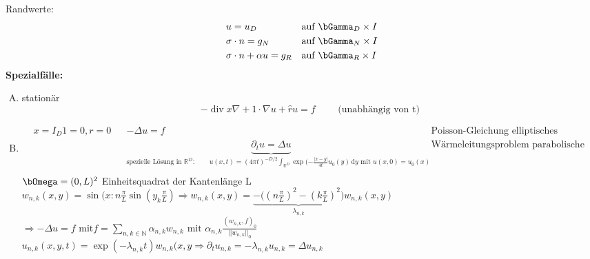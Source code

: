 \documentclass[12pt,twoside,reqno]{article}
\newcommand{\dy}{\,\mathrm{d}y}
\renewcommand\div{\operatorname{div}}
\renewcommand{\Omega}{\bOmega}
\renewcommand{\Gamma}{\bGamma}
\newcommand{\R}{\mathbb{R}}
\newcommand{\N}{\mathbb{N}}
\theoremstyle{TheoWieners}
\theoremstyle{break}
\theoremstyle{app}
\newtheorem{Spezielle Lösungen}[app]{Spezielle Lösungen}
\newtheorem{Spezielle Lösungen der Poisson-Gleichung}[app]{Spezielle Lösungen der Poisson-Gleichung}
\newtheorem{Kartesische Gitter in 2-d}[app]{Kartesische Gitter in 2-d}
\newtheorem{Diskretisierungen hoher Ordnung}[app]{Diskretisierungen hoher Ordnung}
\newtheorem{Zyklische Reduktion}[app]{Zyklische Reduktion}
\begin{document}
        
        Randwerte:
            \begin{align*}
        &u = u_D    &&\text{auf } \Gamma_D \times I \\
        &\sigma \cdot n = g_N    &&\text{auf } \Gamma_N \times I \\
        &\sigma \cdot n  + \alpha u = g_R    &&\text{auf } \Gamma_R \times I \\
    \end{align*}
    \textbf{Spezialfälle:}
    \begin{enumerate}[A)]
  \item stationär $$-\div x \nabla + 1 \cdot \nabla u + \hat{r}u= f \qquad \text{  (unabhängig von t)}$$
      \item            \begin{align*}
        &x = I_D 1=0, r=0    &&-\Delta u =f && \text{Poisson-Gleichung elliptisches Modellproblem} \\
        &    &&\underbrace{\partial_t u =\Delta u}_{\text{spezielle Lösung in } \R^D: \qquad u(x,t)= (4 \pi t)^{-D/2} \int_{\R^D} \exp(- \frac{|x-y|}{4t}u_0(y) \dy \text{ mit } u(x,0)= u_0(x)} &&\text{Wärmeleitungsproblem parabolische Modellproblem}\\
    \end{align*} 
     $\Omega =(0,L)^2$ Einheitsquadrat  der Kantenlänge L \\
     $w_{n,k}(x,y) = \sin(x:n \frac{\pi}{L} \sin(y_k \frac{\pi}{L}) \Rightarrow w_{n,k}(x,y)=\underbrace{- \Big( (n\frac{\pi}{L})^2-(k\frac{\pi}{L})^2 \Big)}_{\lambda_{n,k}} w_{n,k}(x,y)$\\ $ \Rightarrow - \Delta u =f \text{ mit} f= \sum_{n,k \in \N} \alpha_{n,k} w_{n,k} \text{ mit } \alpha_{n,k} \frac{(w_{n,k},f)_0}{||w_{n,k}||_0}$\\
     $u_{n,k}(x,y,t)= \exp(-\lambda_{n,k} t) w_{n,k} (x,y \Rightarrow \partial_t u_{n,k}= - \lambda_{n,k} u_{n,k}= \Delta u_{n,k}$\\
    

\end{enumerate}
\end{document}
